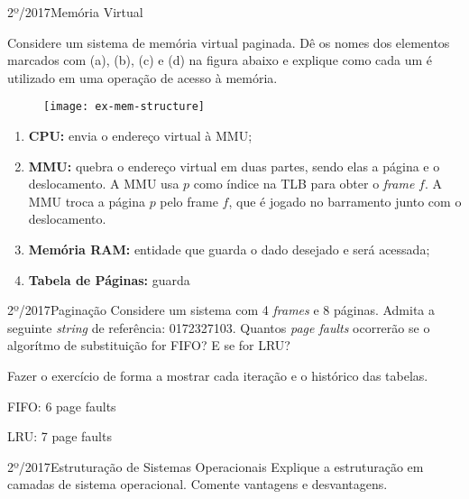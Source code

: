 \begin{exercicio}
  {2º/2017}{Memória Virtual}
  {
    Considere um sistema de memória virtual paginada. Dê os nomes dos elementos marcados com (a), (b), (c) e (d) na figura abaixo e explique como cada um é utilizado em uma operação de acesso à memória.
    \begin{figure}
      \centering
      \texttt{[image: ex-mem-structure]}
    \end{figure}
  }

  \begin{enumerate}[label=(\alph*)]
    \item \textbf{CPU:} envia o endereço virtual à MMU;

    \item \textbf{MMU:} quebra o endereço virtual em duas partes, sendo elas a página e o deslocamento. A MMU usa $p$ como índice na TLB para obter o \textit{frame} $f$. A MMU troca a página $p$ pelo frame $f$, que é jogado no barramento junto com o deslocamento.

    \item \textbf{Memória RAM:} entidade que guarda o dado desejado e será acessada;

    \item \textbf{Tabela de Páginas:} guarda %
  \end{enumerate}
\end{exercicio}


\begin{exercicio}
  {2º/2017}{Paginação}
  {Considere um sistema com 4 \textit{frames} e 8 páginas. Admita a seguinte \textit{string} de referência: 0172327103. Quantos \textit{page faults} ocorrerão se o algorítmo de substituição for FIFO? E se for LRU?}

  Fazer o exercício de forma a mostrar cada iteração e o histórico das tabelas.

  FIFO: 6 page faults

  LRU: 7 page faults
\end{exercicio}

\begin{exercicio}
  {2º/2017}{Estruturação de Sistemas Operacionais}
  {Explique a estruturação em camadas de sistema operacional. Comente vantagens e desvantagens.}

\end{exercicio}

